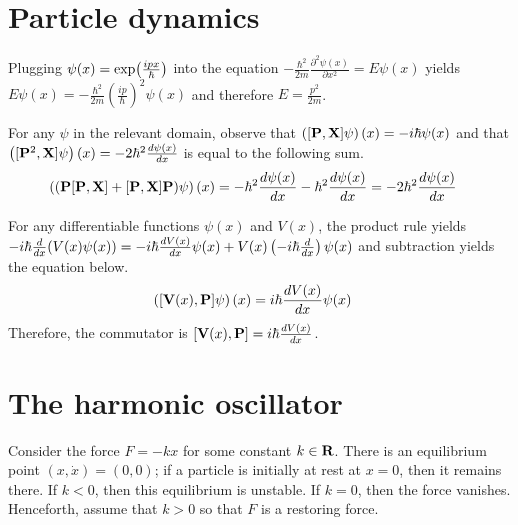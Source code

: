 \section{Particle dynamics}

\begin{answer}
	Plugging $\psi(x) = \exp\!\left(\frac{i p x}{\hbar}\right)$ into the equation $- \frac{\hbar^2}{2 m} \frac{\partial^2 \psi(x)}{\partial x^2} = E \psi(x)$ yields $E \psi(x) = - \frac{\hbar^2}{2 m} \left(\frac{i p}{\hbar}\right)^2 \psi(x)$ and therefore $E = \frac{p^2}{2m}$.
\end{answer}

\begin{answer}
	For any $\psi$ in the relevant domain, observe that $\left([\mathbf{P}, \mathbf{X}] \psi\right)(x) = -i \hbar \psi(x)$ and that $\left([\mathbf{P}^2, \mathbf{X}] \psi\right) (x) = - 2 \hbar^2 \frac{d \psi(x)}{dx}$ is equal to the following sum.
	\begin{align}
		\left((\mathbf{P}[\mathbf{P}, \mathbf{X}] + [\mathbf{P}, \mathbf{X}] \mathbf{P}) \psi \right)(x)
		 & =
		- \hbar^2 \frac{d \psi(x)}{dx} - \hbar^2 \frac{d \psi(x)}{dx}
		= - 2 \hbar^2 \frac{d \psi(x)}{dx}
	\end{align}
\end{answer}

\begin{answer}
	For any differentiable functions $\psi(x)$ and $V(x)$, the product rule yields $-i \hbar \frac{d}{dx}\!\left(V(x) \psi(x)\right) = -i \hbar \frac{dV(x)}{dx} \psi(x) + V(x) \left(-i \hbar \frac{d}{dx}\right)\psi(x)$ and subtraction yields the equation below.
	\begin{align}
		\left([\mathbf{V}(x), \mathbf{P}] \psi\right)(x) & = i \hbar \frac{dV(x)}{dx} \psi(x)
	\end{align}
	Therefore, the commutator is $\left[\mathbf{V}(x), \mathbf{P}\right] = i \hbar \frac{dV(x)}{dx}$.
\end{answer}

\section{The harmonic oscillator}

Consider the force $F = -k x$ for some constant $k \in \mathbf{R}$.
There is an equilibrium point $(x, \dot{x}) = (0, 0)$; if a particle is initially at rest at $x=0$, then it remains there.
If $k < 0$, then this equilibrium is unstable.
If $k = 0$, then the force vanishes.
Henceforth, assume that $k > 0$ so that $F$ is a restoring force.

